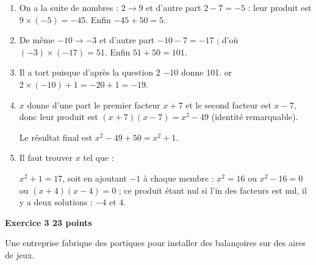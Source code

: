 \documentclass[10pt]{article}
\begin{document}
\begin{enumerate}
\item %
On a la suite de nombres : $2 \to 9$ et d'autre part $2 - 7 = - 5$ : leur produit est $9 \times (- 5) = - 45$. Enfin $- 45 + 50 = 5$.
\item %
De même $- 10 \to - 3$ et d'autre part $- 10 - 7 = - 17$ ; d'où $(- 3) \times (- 17) = 51$. Enfin $51 + 50 = 101$.
\item %


Il a tort puisque d'après la question 2 $- 10$ donne 101. or $2 \times (- 10) + 1 = - 20 + 1 = - 19$. 
\item %
$x$ donne d'une part le premier facteur $x + 7$ et le second facteur est $x - 7$, donc leur produit  est $(x + 7)(x - 7) = x^2 - 49$ (identité remarquable).

Le résultat final est $x^2 - 49 + 50 = x^2 + 1$.
\item %
Il faut trouver $x$ tel que :

$x^2 + 1 = 17$, soit en ajoutant $- 1$ à chaque membre : $x^2 = 16$ ou $x^2 - 16 = 0$ ou $(x + 4)(x - 4) = 0$ ; ce produit étant nul si l'in des facteurs est nul, il y a deux solutions : $- 4$ et $4$.
\end{enumerate}

\bigskip

\textbf{Exercice 3 \hfill 23 points}

\medskip

Une entreprise fabrique des portiques pour installer des balançoires sur des aires de jeux.

\medskip
\end{document}
